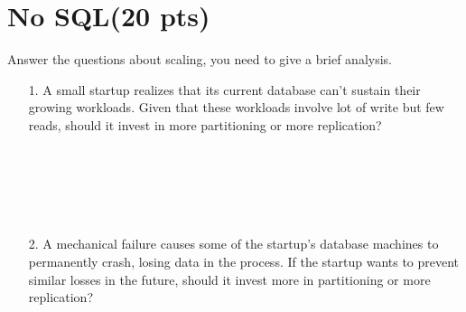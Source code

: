 \documentclass[paper=a4, fontsize=11pt]{scrartcl}
\numberwithin{equation}{section}		%
\numberwithin{figure}{section}			%
\numberwithin{table}{section}				%
\begin{document}
\section{No SQL(20 pts)}
 Answer the questions about scaling, you need to give a brief analysis.
\begin{itemize}
\item [1.] A small startup realizes that its current database can’t sustain their growing workloads. Given
that these workloads involve lot of write but few reads, should it invest in more partitioning or
more replication?\\~\\~\\~\\~\\~\\
\item [2.] A mechanical failure causes some of the startup’s database machines to permanently crash,
losing data in the process. If the startup wants to prevent similar losses in the future, should it
invest more in partitioning or more replication?
\end{itemize}
\end{document}
